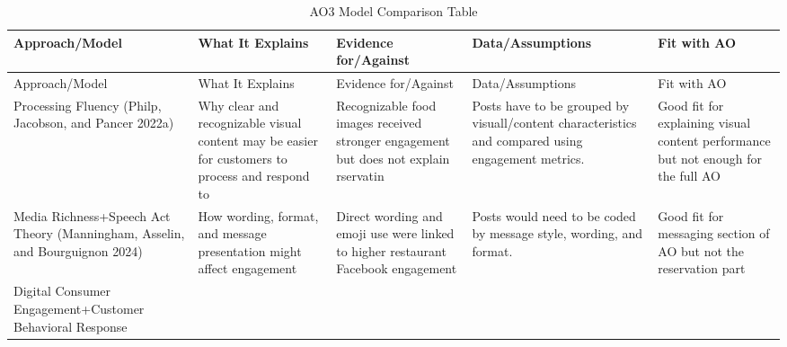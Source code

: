 \documentclass[
  12pt,
  letterpaper,
  DIV=11,
  numbers=noendperiod]{scrartcl}
\begin{document}
\begin{longtable}[]{@{}
  >{\raggedright\arraybackslash}p{}
  >{\raggedright\arraybackslash}p{}
  >{\raggedright\arraybackslash}p{}
  >{\raggedright\arraybackslash}p{}
  >{\raggedright\arraybackslash}p{}@{}}
\caption{AO3 Model Comparison Table}\tabularnewline
\toprule\noalign{}
\begin{minipage}[b]{\linewidth}\raggedright
Approach/Model
\end{minipage} & \begin{minipage}[b]{\linewidth}\raggedright
What It Explains
\end{minipage} & \begin{minipage}[b]{\linewidth}\raggedright
Evidence for/Against
\end{minipage} & \begin{minipage}[b]{\linewidth}\raggedright
Data/Assumptions
\end{minipage} & \begin{minipage}[b]{\linewidth}\raggedright
Fit with AO
\end{minipage} \\
\midrule\noalign{}
\endfirsthead
\toprule\noalign{}
\begin{minipage}[b]{\linewidth}\raggedright
Approach/Model
\end{minipage} & \begin{minipage}[b]{\linewidth}\raggedright
What It Explains
\end{minipage} & \begin{minipage}[b]{\linewidth}\raggedright
Evidence for/Against
\end{minipage} & \begin{minipage}[b]{\linewidth}\raggedright
Data/Assumptions
\end{minipage} & \begin{minipage}[b]{\linewidth}\raggedright
Fit with AO
\end{minipage} \\
\midrule\noalign{}
\endhead
\bottomrule\noalign{}
\endlastfoot
Processing Fluency (Philp, Jacobson, and Pancer 2022a) & Why clear and
recognizable visual content may be easier for customers to process and
respond to & Recognizable food images received stronger engagement but
does not explain rservatin & Posts have to be grouped by visuall/content
characteristics and compared using engagement metrics. & Good fit for
explaining visual content performance but not enough for the full AO \\
Media Richness+Speech Act Theory (Manningham, Asselin, and Bourguignon
2024) & How wording, format, and message presentation might affect
engagement & Direct wording and emoji use were linked to higher
restaurant Facebook engagement & Posts would need to be coded by message
style, wording, and format. & Good fit for messaging section of AO but
not the reservation part \\
Digital Consumer Engagement+Customer Behavioral Response


\end{longtable}
\end{document}
